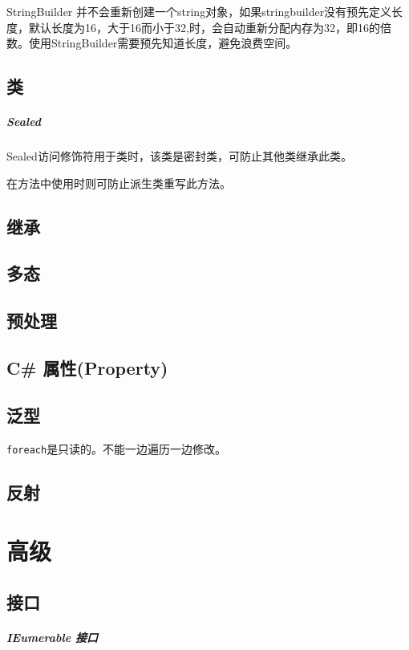 \documentclass[UTF8,a4paper,12pt]{ctexbook}
\begin{document}
				StringBuilder 并不会重新创建一个string对象，如果stringbuilder没有预先定义长度，默认长度为16，大于16而小于32,时，会自动重新分配内存为32，即16的倍数。使用StringBuilder需要预先知道长度，避免浪费空间。
				
	\section{类}
		\paragraph{Sealed}
			Sealed访问修饰符用于类时，该类是密封类，可防止其他类继承此类。
			
			在方法中使用时则可防止派生类重写此方法。
			
	\section{继承}
	
	\section{多态}
	
	\section{预处理}
	
	\section{C\# 属性(Property)}
	
	\section{泛型}
		\verb|foreach|是只读的。不能一边遍历一边修改。
	
	\section{反射}
	
\chapter{高级}
	\section{接口}
		\paragraph{IEumerable 接口}
		
\end{document}
